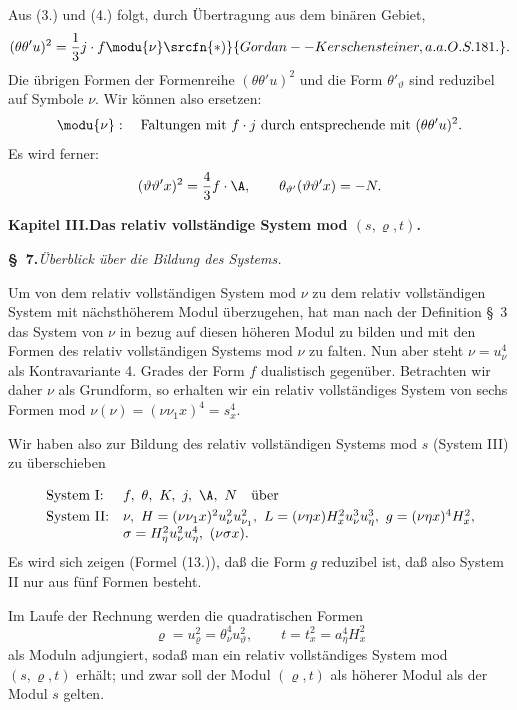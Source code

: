 Aus (3.) und (4.) folgt, durch Übertragung aus dem binären Gebiet,
\[
(\theta\theta'u)^2=\frac13 j\cdot f\modu{\nu}\srcfn{*)}{Gordan--Kerschensteiner, a. a. O. S. 181.}.
\]
Die übrigen Formen der Formenreihe $(\theta\theta'u)^2$ und die Form $\theta'_\vartheta$ sind reduzibel auf Symbole $\nu$. Wir können also ersetzen:
\[
\modu{\nu}:\quad \text{Faltungen mit } f\cdot j \text{ durch entsprechende mit }(\theta\theta'u)^2.
\]
Es wird ferner:
\[
(\vartheta\vartheta'x)^2=\frac43 f\cdot\A,\qquad
\theta_{\vartheta'}(\vartheta\vartheta'x)=-N.
\]

\begin{center}
{\Large\bfseries Kapitel III.\quad Das relativ vollständige System mod $(s,\varrho,t)$.}
\end{center}

\begin{center}
\textbf{\S\ 7.}\quad\emph{Überblick über die Bildung des Systems.}
\end{center}

Um von dem relativ vollständigen System mod $\nu$ zu dem relativ vollständigen System mit nächsthöherem Modul überzugehen, hat man nach der Definition \S\ 3 das System von $\nu$ in bezug auf diesen höheren Modul zu bilden und mit den Formen des relativ vollständigen Systems mod $\nu$ zu falten. Nun aber steht $\nu=u_\nu^4$ als Kontravariante 4. Grades der Form $f$ dualistisch gegenüber. Betrachten wir daher $\nu$ als Grundform, so erhalten wir ein relativ vollständiges System von sechs Formen mod $\nu(\nu)=(\nu\nu_1x)^4=s_x^4$.

Wir haben also zur Bildung des relativ vollständigen Systems mod $s$ (System III) zu überschieben
\[
\begin{array}{ll}
\text{System I:} & f,\ \theta,\ K,\ j,\ \A,\ N\quad \text{über}\vphantom{\dfrac11}\\[0.3em]
\text{System II:} & \nu,\ H=(\nu\nu_1x)^2u_\nu^2u_{\nu_1}^2,\ L=(\nu\eta x)H_x^2u_\nu^3u_\eta^3,\ g=(\nu\eta x)^4H_x^2,\\
& \sigma=H_\eta^2u_\nu^2u_\eta^4,\ (\nu\sigma x).
\end{array}
\]
Es wird sich zeigen (Formel (13.)), daß die Form $g$ reduzibel ist, daß also System II nur aus fünf Formen besteht.

Im Laufe der Rechnung werden die quadratischen Formen
\[
\varrho=u_\varrho^2=\theta_\nu^4u_\vartheta^2,\qquad t=t_x^2=a_\eta^4H_x^2
\]
als Moduln adjungiert, sodaß man ein relativ vollständiges System mod $(s,\varrho,t)$ erhält; und zwar soll der Modul $(\varrho,t)$ als höherer Modul als der Modul $s$ gelten.

